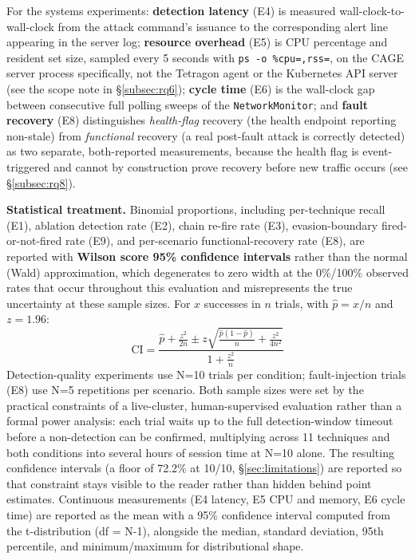 \documentclass{ieeeaccess}
\begin{document}
For the systems experiments: \textbf{detection latency} (E4) is measured
wall-clock-to-wall-clock from the attack command's issuance to the
corresponding alert line appearing in the server log; \textbf{resource
overhead} (E5) is CPU percentage and resident set size, sampled every
5 seconds with \texttt{ps -o \%cpu=,rss=}, on the CAGE server process
specifically, not the Tetragon agent or the Kubernetes API server (see
the scope note in \S\ref{subsec:rq6}); \textbf{cycle time} (E6) is the wall-clock gap
between consecutive full polling sweeps of the \texttt{NetworkMonitor}; and
\textbf{fault recovery} (E8) distinguishes \emph{health-flag} recovery (the
health endpoint reporting non-stale) from \emph{functional} recovery (a
real post-fault attack is correctly detected) as two separate,
both-reported measurements, because the health flag is event-triggered
and cannot by construction prove recovery before new traffic occurs
(see \S\ref{subsec:rq8}).

\textbf{Statistical treatment.} Binomial proportions, including
per-technique recall (E1), ablation detection rate (E2), chain re-fire
rate (E3), evasion-boundary fired-or-not-fired rate (E9), and
per-scenario functional-recovery rate (E8), are reported with \textbf{Wilson
score 95\% confidence intervals} \cite{ref14} rather than the normal (Wald)
approximation, which degenerates to zero width at the 0\%/100\% observed
rates that occur throughout this evaluation and misrepresents the true
uncertainty at these sample sizes. For $x$ successes in $n$ trials, with
$\hat{p} = x/n$ and $z = 1.96$:
\begin{equation}
\mathrm{CI} = \frac{\hat{p} + \frac{z^2}{2n} \pm z\sqrt{\frac{\hat{p}(1-\hat{p})}{n} + \frac{z^2}{4n^2}}}{1 + \frac{z^2}{n}}
\label{eq:wilson}
\end{equation}
Detection-quality experiments use N=10 trials per condition; fault-injection trials (E8) use N=5
repetitions per scenario. Both sample sizes were set by the practical
constraints of a live-cluster, human-supervised evaluation rather than
a formal power analysis: each trial waits up to the full
detection-window timeout before a non-detection can be confirmed,
multiplying across 11 techniques and both conditions into several
hours of session time at N=10 alone. The resulting confidence
intervals (a floor of 72.2\% at 10/10, \S\ref{sec:limitations}) are
reported so that constraint stays visible to the reader rather than
hidden behind point estimates. Continuous measurements (E4 latency, E5 CPU and
memory, E6 cycle time) are reported as the mean with a 95\% confidence
interval computed from the t-distribution (df = N-1), alongside the
median, standard deviation, 95th percentile, and minimum/maximum for
distributional shape.
\end{document}
